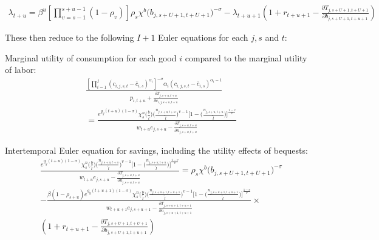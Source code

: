 \documentclass[letterpaper,11pt]{article}
\theoremstyle{definition}
\begin{document}
\begin{equation}
  \begin{split}
  \lambda_{t+u} = \beta^u\left[\prod_{v=s-1}^{s+u-1}(1-\rho_v)\right] \rho_s\chi^b\bigl(b_{j,s+U+1,t+U+1}\bigr)^{-\sigma} - \lambda_{t+u+1} \left( 1 + r_{t+u+1} - \frac{\partial T_{j,s+U+1,t+U+1}}{\partial b_{j,s+U+1,t+u+1}} \right)
    \end{split}  \nonumber
\end{equation}

These then reduce to the following $I+1$ Euler equations for each $j,s$ and $t$:

Marginal utility of consumption for each good $i$ compared to the marginal utility of labor:
\begin{equation}\label{EqcEuler}
  \begin{split}
  & \frac{ \left[ \prod_{i=1}^I \left( c_{i,j,s,t} - \bar c_{i,s} \right) ^{\alpha_i} \right]^{-\sigma}\alpha_i \left( c_{i,j,s,t} - \bar c_{i,s} \right)^{\alpha_i-1} } { p_{i,t+u} + \frac{\partial T_{j,s+u,t+u}}{\partial c_{i,j,s+u,t+u}} } \\
  & = \frac{ e^{g_y (t+u)(1-\sigma)}\chi^n_{s}\biggl(\frac{b}{\tilde{l}}\biggr)\biggl(\frac{n_{j,s+u,t+u}}{\tilde{l}}\biggr)^{v-1}\Biggl[1 - \biggl(\frac{n_{j,s+u,t+u}}{\tilde{l}}\biggr)\Biggr]^{\frac{1-v}{v}} } { w_{t+u} e_{j,s+u} - \frac{\partial T_{j,s+u,t+u}}{\partial n_{j,s+u,t+u}} }
   \end{split}
\end{equation}

Intertemporal Euler equation for savings, including the utility effects of bequests:
\begin{equation}\label{EqbEuler}
  \begin{split}
  & \frac{ e^{g_y (t+u)(1-\sigma)}\chi^n_{s}\biggl(\frac{b}{\tilde{l}}\biggr)\biggl(\frac{n_{j,s+u,t+u}}{\tilde{l}}\biggr)^{v-1}\Biggl[1 - \biggl(\frac{n_{j,s+u,t+u}}{\tilde{l}}\biggr)\Biggr]^{\frac{1-v}{v}} } { w_{t+u} e_{j,s+u} - \frac{\partial T_{j,s+u,t+u}}{\partial n_{j,s+u,t+u}} } = \rho_s\chi^b\bigl(b_{j,s+U+1,t+U+1}\bigr)^{-\sigma}\\ 
  &  - \frac{ \beta(1-\rho_{s+u}) e^{g_y (t+u+1)(1-\sigma)}\chi^n_{s}\biggl(\frac{b}{\tilde{l}}\biggr)\biggl(\frac{n_{j,s+u+1,t+u+1}}{\tilde{l}}\biggr)^{v-1}\Biggl[1 - \biggl(\frac{n_{j,s+u+1,t+u+1}}{\tilde{l}}\biggr)\Biggr]^{\frac{1-v}{v}} } { w_{t+u+1} e_{j,s+u+1} - \frac{\partial T_{j,s+u+1,t+u+1}}{\partial n_{j,s+u+1,t+u+1}} } \times \\
  & \left( 1 + r_{t+u+1} - \frac{\partial T_{j,s+U+1,t+U+1}}{\partial b_{j,s+U+1,t+u+1}} \right)
  \end{split}
\end{equation}
\end{document}
